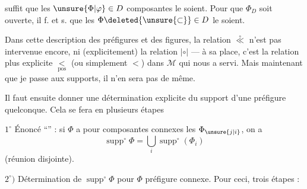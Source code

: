 
suffit que les $\unsure{\Phi|\varphi}\in D$ composantes le soient. Pour que $\Phi_D$ soit ouverte, il f. et s. que les $\Phi\deleted{\unsure{\subset}}\in D$ le soient.

Dans cette description des préfigures et des figures, la relation $\overset{\circ}{\ll}$ n'est pas intervenue encore, ni (explicitement) la relation $\mathrel{|\circ|}$ --- à sa place, c'est la relation plus explicite $\underset{\mathrm{pos}}{<}$ (ou simplement $<$) dans $\mathscr{M}$ qui nous a servi. Mais maintenant que je passe aux supports, il n'en sera pas de même.

Il faut ensuite donner une détermination explicite du support d'une préfigure quelconque. Cela se fera en plusieurs étapes

\textcircled{\scriptsize $1^{\circ}$} Énoncé ``'' : si  $\Phi$ a pour composantes connexes les $\Phi_{\unsure{j|i}}$, on a
\[
\operatorname{supp}^{\circ}\Phi=\bigcup_i\operatorname{supp}^{\circ}(\Phi_i)
\]
(réunion disjointe).

$2^{\circ})$ Détermination de $\operatorname{supp}^{\circ}\Phi$ pour $\Phi$ préfigure connexe. Pour ceci, trois étapes :
